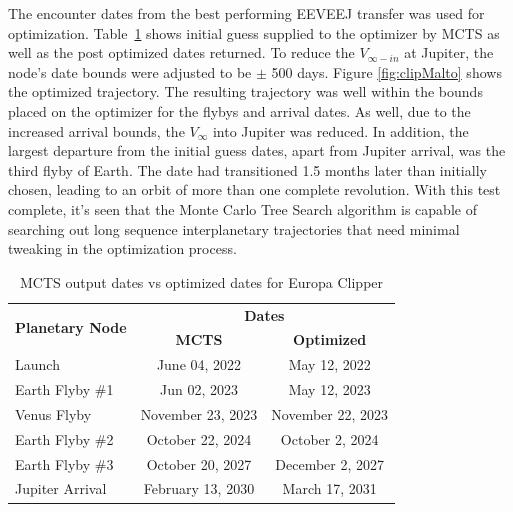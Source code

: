 \documentclass[letterpaper, preprint, paper,11pt]{AAS}	%
\begin{document}
The encounter dates from the best performing EEVEEJ transfer was used for optimization. Table~\ref*{table:clipMInputs} shows initial guess supplied to the optimizer by MCTS as well as the post optimized dates returned. To reduce the $V_{\infty-in}$ at Jupiter, the node's date bounds were adjusted to be $\pm$ 500 days. Figure \ref*{fig:clipMalto} shows the optimized trajectory. The resulting trajectory was well within the bounds placed on the optimizer for the flybys and arrival dates. As well, due to the increased arrival bounds, the $V_\infty$ into Jupiter was reduced. In addition, the largest departure from the initial guess dates, apart from Jupiter arrival, was the third flyby of Earth. The date had transitioned 1.5 months later than initially chosen, leading to an orbit of more than one complete revolution. With this test complete, it's seen that the Monte Carlo Tree Search algorithm is capable of searching out long sequence interplanetary trajectories that need minimal tweaking in the optimization process.
\begin{table}[htb]
    \begin{center}
        \caption{MCTS output dates vs optimized dates for Europa Clipper}
        \label{table:clipMInputs}
        \begin{tabular}{lcc}
            \toprule
            \multirow{2}{*}{\textbf{Planetary Node}} & \multicolumn{2}{c}{\textbf{Dates}}\\
            \cmidrule{2-3}
            {} & \textbf{MCTS} & \textbf{Optimized}\\
            \midrule
            Launch & June 04, 2022 & May 12, 2022 \\
            Earth Flyby \#1 & Jun 02, 2023 & May 12, 2023 \\
            Venus Flyby & November 23, 2023 & November 22, 2023 \\
            Earth Flyby \#2 & October 22, 2024 & October 2, 2024 \\
            Earth Flyby \#3 & October 20, 2027 & December 2, 2027 \\
            Jupiter Arrival & February 13, 2030 & March 17, 2031 \\
            \bottomrule
        \end{tabular}
    \end{center}
\end{table}
\end{document}
